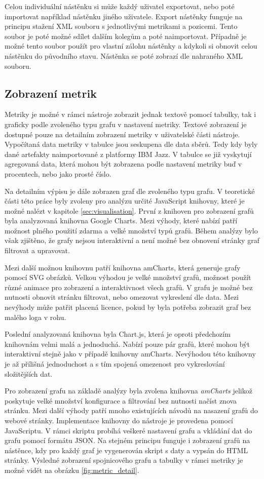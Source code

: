 \documentclass[czech,master,public,dept460,male,cpdeclaration,oneside]{diploma}
\begin{document}
Celou individuální nástěnku si může každý uživatel exportovat, nebo poté importovat například nástěnku jiného uživatele. Export nástěnky funguje na principu stažení XML souboru s jednotlivými metrikami a pozicemi. Tento soubor je poté možné sdílet dalším kolegům a poté naimportovat. Případně je možné tento soubor použít pro vlastní zálohu nástěnky a kdykoli si obnovit celou nástěnku do původního stavu. Nástěnka se poté zobrazí dle nahraného XML souboru. 


\subsection{Zobrazení metrik}
Metriky je možné v rámci nástroje zobrazit jednak textově pomocí tabulky, tak i graficky podle zvoleného typu grafu v nastavení metriky. Textové zobrazení je dostupné pouze na detailním zobrazení metriky v uživatelské části nástroje. Vypočítaná data metriky v tabulce jsou seskupena dle data sběrů. Tedy kdy byly dané artefakty naimportované z platformy IBM Jazz. V tabulce se již vyskytují agregovaná data, která mohou být zobrazena podle nastavení metriky buď v procentech, nebo jako prosté číslo.

Na detailním výpisu je dále zobrazen graf dle zvoleného typu grafu. V teoretické části této práce byly zvoleny pro analýzu určité JavaScript knihovny, které je možné nalézt v kapitole \ref{sec:visualisation}. První z knihoven pro zobrazení grafů byla analyzovaná knihovna Google Charts. Mezi výhody, které nabízí patří možnost plného použití zdarma a velké množství typů grafů. Během analýzy bylo však zjištěno, že grafy nejsou interaktivní a není možné bez obnovení stránky graf filtrovat a upravovat.

Mezi další možnou knihovnu patří knihovna amCharts, která generuje grafy pomocí SVG obrázků. Velkou výhodou je velké množství grafů, možnost použít různé animace pro zobrazení a interaktivnost všech grafů. V grafu je možné bez nutnosti obnovit stránku filtrovat, nebo omezovat vykreslení dle data. Mezi nevýhody může patřit placená licence, pokud by byla potřeba zobrazit graf bez malého loga v rohu.

Poslední analyzovaná knihovna byla Chart.js, která je oproti předchozím knihovnám velmi malá a jednoduchá. Nabízí pouze pár grafů, které mohou být interaktivní stejně jako v případě knihovny amCharts. Nevýhodou této knihovny je až přílišná jednoduchost a s tím spojená omezenost pro vykreslování složitějších dat.

Pro zobrazení grafu na základě analýzy byla zvolena knihovna \textit{amCharts} jelikož poskytuje velké množství konfigurace a filtrování bez nutnosti načíst znova stránku. Mezi další výhody patří mnoho existujících návodů na nasazení grafů do webové stránky. Implementace knihovny do nástroje je provedena pomocí JavaScriptu. V rámci skriptu probíhá veškeré nastavení grafu a vkládání dat do grafu pomocí formátu JSON. Na stejném principu funguje i zobrazení grafů na nástěnce, kdy pro každý graf je vygenerován skript s daty a vypsán do HTML stránky. Výsledné zobrazení spojnicového grafu a tabulky v rámci metriky je možné vidět na obrázku \ref{fig:metric_detail}.
\end{document}
